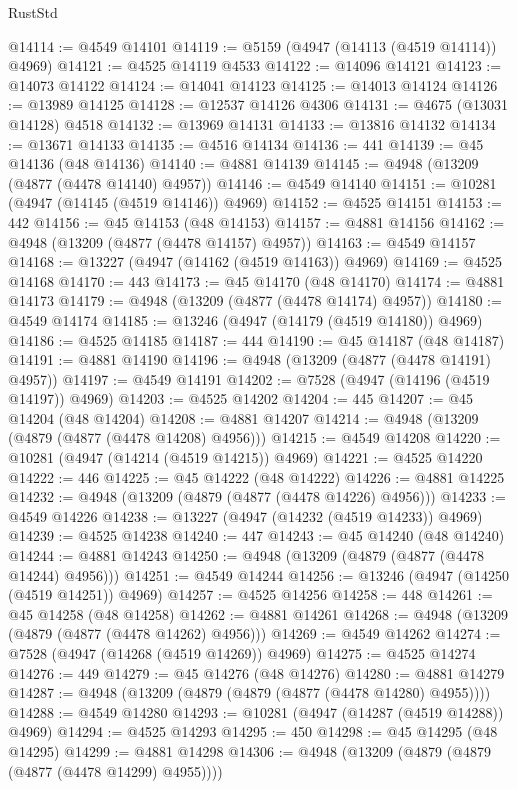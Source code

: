 \begin{lexlean}{RustStd}
\begin{coremodule}
{\begin{coremodule}
{{{{{{{{{{{{{{{{{{{{{{{{{{{{{{{{{{{{{{{{{{{{{{{{{{{{{{{{{{{{@14114 := @4549 @14101
@14119 := @5159 (@4947 (@14113 (@4519 @14114)) @4969)
@14121 := @4525 @14119 @4533
@14122 := @14096 @14121
@14123 := @14073 @14122
@14124 := @14041 @14123
@14125 := @14013 @14124
@14126 := @13989 @14125
@14128 := @12537 @14126 @4306
@14131 := @4675 (@13031 @14128) @4518
@14132 := @13969 @14131
@14133 := @13816 @14132
@14134 := @13671 @14133
@14135 := @4516 @14134
@14136 := 441
@14139 := @45 @14136 (@48 @14136)
@14140 := @4881 @14139
@14145 := @4948 (@13209 (@4877 (@4478 @14140) @4957))
@14146 := @4549 @14140
@14151 := @10281 (@4947 (@14145 (@4519 @14146)) @4969)
@14152 := @4525 @14151
@14153 := 442
@14156 := @45 @14153 (@48 @14153)
@14157 := @4881 @14156
@14162 := @4948 (@13209 (@4877 (@4478 @14157) @4957))
@14163 := @4549 @14157
@14168 := @13227 (@4947 (@14162 (@4519 @14163)) @4969)
@14169 := @4525 @14168
@14170 := 443
@14173 := @45 @14170 (@48 @14170)
@14174 := @4881 @14173
@14179 := @4948 (@13209 (@4877 (@4478 @14174) @4957))
@14180 := @4549 @14174
@14185 := @13246 (@4947 (@14179 (@4519 @14180)) @4969)
@14186 := @4525 @14185
@14187 := 444
@14190 := @45 @14187 (@48 @14187)
@14191 := @4881 @14190
@14196 := @4948 (@13209 (@4877 (@4478 @14191) @4957))
@14197 := @4549 @14191
@14202 := @7528 (@4947 (@14196 (@4519 @14197)) @4969)
@14203 := @4525 @14202
@14204 := 445
@14207 := @45 @14204 (@48 @14204)
@14208 := @4881 @14207
@14214 := @4948 (@13209 (@4879 (@4877 (@4478 @14208) @4956)))
@14215 := @4549 @14208
@14220 := @10281 (@4947 (@14214 (@4519 @14215)) @4969)
@14221 := @4525 @14220
@14222 := 446
@14225 := @45 @14222 (@48 @14222)
@14226 := @4881 @14225
@14232 := @4948 (@13209 (@4879 (@4877 (@4478 @14226) @4956)))
@14233 := @4549 @14226
@14238 := @13227 (@4947 (@14232 (@4519 @14233)) @4969)
@14239 := @4525 @14238
@14240 := 447
@14243 := @45 @14240 (@48 @14240)
@14244 := @4881 @14243
@14250 := @4948 (@13209 (@4879 (@4877 (@4478 @14244) @4956)))
@14251 := @4549 @14244
@14256 := @13246 (@4947 (@14250 (@4519 @14251)) @4969)
@14257 := @4525 @14256
@14258 := 448
@14261 := @45 @14258 (@48 @14258)
@14262 := @4881 @14261
@14268 := @4948 (@13209 (@4879 (@4877 (@4478 @14262) @4956)))
@14269 := @4549 @14262
@14274 := @7528 (@4947 (@14268 (@4519 @14269)) @4969)
@14275 := @4525 @14274
@14276 := 449
@14279 := @45 @14276 (@48 @14276)
@14280 := @4881 @14279
@14287 := @4948 (@13209 (@4879 (@4879 (@4877 (@4478 @14280) @4955))))
@14288 := @4549 @14280
@14293 := @10281 (@4947 (@14287 (@4519 @14288)) @4969)
@14294 := @4525 @14293
@14295 := 450
@14298 := @45 @14295 (@48 @14295)
@14299 := @4881 @14298
@14306 := @4948 (@13209 (@4879 (@4879 (@4877 (@4478 @14299) @4955))))
}}}}}}}}}}}}}}}}}}}}}}}}}}}}}}}}}}}}}}}}}}}}}}}}}}}}}}}}}}}}
\end{coremodule}}
\end{coremodule}
\end{lexlean}
